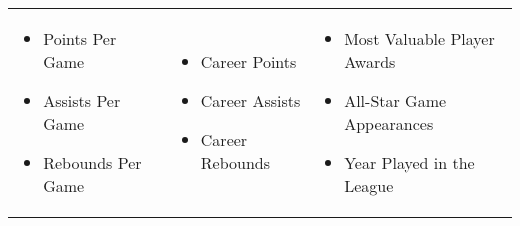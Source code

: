 \documentclass[paper=a4, fontsize=11pt]{scrartcl} %
\numberwithin{equation}{section} %
\numberwithin{figure}{section} %
\numberwithin{table}{section} %
\begin{document}
\begin{tabular}{p{} p{}p{}}

\begin{itemize}
  \item Points Per Game
  \item Assists Per Game
  \item Rebounds Per Game
  \end{itemize} &

\begin{itemize}
  \item Career Points
  \item Career Assists
  \item Career Rebounds
\end{itemize} &

\begin{itemize}
  \item Most Valuable Player Awards
  \item All-Star Game Appearances
  \item Year Played in the League
\end{itemize}

\end{tabular}
\end{document}
